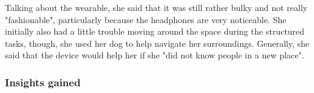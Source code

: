 Talking about the wearable, she said that it was still rather bulky and not really "fashionable", particularly because the headphones are very noticeable. She initially also had a little trouble moving around the space during the structured tasks, though, she used her dog to help navigate her surroundings. Generally, she said that the device would help her if she "did not know people in a new place".





\subsubsection{Insights gained }
 

